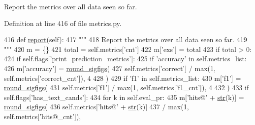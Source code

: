 \begin{DoxyVerb}Report the metrics over all data seen so far.
\end{DoxyVerb}
 

Definition at line 416 of file metrics.\+py.


\begin{DoxyCode}
416     \textcolor{keyword}{def }\hyperlink{namespaceprojects_1_1convai2_1_1eval__f1_a01a47b9c08dad189837a51f085defc45}{report}(self):
417         \textcolor{stringliteral}{"""}
418 \textcolor{stringliteral}{        Report the metrics over all data seen so far.}
419 \textcolor{stringliteral}{        """}
420         m = \{\}
421         total = self.metrics[\textcolor{stringliteral}{'cnt'}]
422         m[\textcolor{stringliteral}{'exs'}] = total
423         \textcolor{keywordflow}{if} total > 0:
424             \textcolor{keywordflow}{if} self.flags[\textcolor{stringliteral}{'print\_prediction\_metrics'}]:
425                 \textcolor{keywordflow}{if} \textcolor{stringliteral}{'accuracy'} \textcolor{keywordflow}{in} self.metrics\_list:
426                     m[\textcolor{stringliteral}{'accuracy'}] = \hyperlink{namespaceparlai_1_1agents_1_1legacy__agents_1_1seq2seq_1_1utils__v0_af377ec61bfc0423461e7b409ffc883b9}{round\_sigfigs}(
427                         self.metrics[\textcolor{stringliteral}{'correct'}] / max(1, self.metrics[\textcolor{stringliteral}{'correct\_cnt'}]), 4
428                     )
429                 \textcolor{keywordflow}{if} \textcolor{stringliteral}{'f1'} \textcolor{keywordflow}{in} self.metrics\_list:
430                     m[\textcolor{stringliteral}{'f1'}] = \hyperlink{namespaceparlai_1_1agents_1_1legacy__agents_1_1seq2seq_1_1utils__v0_af377ec61bfc0423461e7b409ffc883b9}{round\_sigfigs}(
431                         self.metrics[\textcolor{stringliteral}{'f1'}] / max(1, self.metrics[\textcolor{stringliteral}{'f1\_cnt'}]), 4
432                     )
433             \textcolor{keywordflow}{if} self.flags[\textcolor{stringliteral}{'has\_text\_cands'}]:
434                 \textcolor{keywordflow}{for} k \textcolor{keywordflow}{in} self.eval\_pr:
435                     m[\textcolor{stringliteral}{'hits@'} + \hyperlink{namespacegenerate__task__READMEs_a5b88452ffb87b78c8c85ececebafc09f}{str}(k)] = \hyperlink{namespaceparlai_1_1agents_1_1legacy__agents_1_1seq2seq_1_1utils__v0_af377ec61bfc0423461e7b409ffc883b9}{round\_sigfigs}(
436                         self.metrics[\textcolor{stringliteral}{'hits@'} + \hyperlink{namespacegenerate__task__READMEs_a5b88452ffb87b78c8c85ececebafc09f}{str}(k)]
437                         / max(1, self.metrics[\textcolor{stringliteral}{'hits@\_cnt'}]),

\end{DoxyCode}
